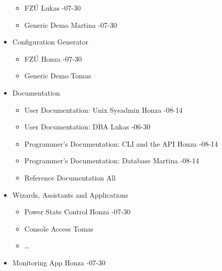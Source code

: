 \documentclass{article}
\begin{document}
\begin{itemize}
        \begin{itemize}
            \item FZÚ \tab Lukas -07-30
            \item Generic Demo \tab Martina -07-30
        \end{itemize}
    \item Configuration Generator
        \begin{itemize}
            \item FZÚ \tab Honza -07-30
            \item Generic Demo \tab Tomas
        \end{itemize}
    \item Documentation
        \begin{itemize}
            \item User Documentation: Unix Sysadmin \tab Honza -08-14
            \item User Documentation: DBA \tab Lukas -06-30
            \item Programmer's Documentation: CLI and the API \tab Honza -08-14
            \item Programmer's Documentation: Database \tab Martina -08-14
            \item Reference Documentation \tab All
        \end{itemize}
    \item Wizards, Assistants and Applications
        \begin{itemize}
            \item Power State Control \tab Honza -07-30
            \item Console Access \tab Tomas
            \item \ldots
        \end{itemize}
    \item Monitoring App \tab Honza -07-30
\end{itemize}
\end{document}
